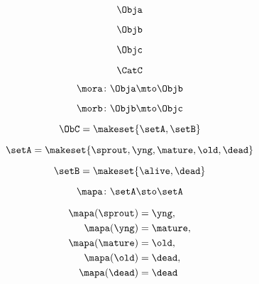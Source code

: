 \begin{forslides}
    \begin{equation}
        \label{eq:semicats-slides-71}
        \Obja
    \end{equation}

    \begin{equation}
        \label{eq:semicats-slides-72}
        \Objb
    \end{equation}

    \begin{equation}
        \label{eq:semicats-slides-73}
        \Objc
    \end{equation}

    \begin{equation}
        \label{eq:semicats-slides-74}
        \CatC
    \end{equation}

    \begin{equation}
        \label{eq:semicats-slides-75}
        \mora\colon \Obja \mto \Objb
    \end{equation}

    \begin{equation}
        \label{eq:semicats-slides-76}
        \morb\colon \Objb \mto \Objc
    \end{equation}

    \begin{equation}
        \label{eq:semicats-slides-77}
        \ObC = \makeset{ \setA, \setB }
    \end{equation}

    \begin{equation}
        \label{eq:semicats-slides-78}
        \setA = \makeset{ \sprout, \yng, \mature, \old, \dead }
    \end{equation}

    \begin{equation}
        \label{eq:semicats-slides-79}
        \setB = \makeset{ \alive, \dead }
    \end{equation}

    \begin{equation}
        \label{eq:semicats-slides-80}
        \mapa \colon \setA \sto \setA
    \end{equation}

    \begin{equation}
        \label{eq:semicats-slides-81}
        \begin{aligned}
            \mapa(\sprout) & =  \yng, \\
            \mapa(\yng)    & =  \mature, \\
            \mapa(\mature) & =  \old, \\
            \mapa( \old)   & = \dead, \\
            \mapa(\dead)   & = \dead
        \end{aligned}
    \end{equation}


\end{forslides}
